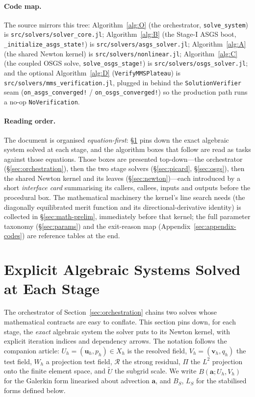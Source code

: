 \documentclass{article}
\newcommand{\code}[1]{\texttt{\small #1}}
\begin{document}
\paragraph{Code map.}  The source mirrors this tree:
Algorithm~\ref{alg:O} (the orchestrator, \code{solve\_system}) is \code{src/solvers/solver\_core.jl};
Algorithm~\ref{alg:B} (the Stage-I ASGS boot, \code{\_initialize\_asgs\_state!}) is
\code{src/solvers/asgs\_solver.jl}; Algorithm~\ref{alg:A} (the shared Newton kernel) is
\code{src/solvers/nonlinear.jl}; Algorithm~\ref{alg:C} (the coupled OSGS solve,
\code{solve\_osgs\_stage!}) is \code{src/solvers/osgs\_solver.jl}; and the optional Algorithm~\ref{alg:D}
(\code{VerifyMMSPlateau}) is \code{src/solvers/mms\_verification.jl}, plugged in behind the
\code{SolutionVerifier} seam (\code{on\_asgs\_converged!} / \code{on\_osgs\_converged!}) so the production
path runs a no-op \code{NoVerification}.

\paragraph{Reading order.}  The document is organised \emph{equation-first}:
§\ref{sec:algebraic-systems} pins down the exact algebraic system solved at
each stage, and the algorithm boxes that follow are read as tasks against
those equations. Those boxes are presented top-down---the orchestrator
(§\ref{sec:orchestration}), then the two stage solvers (§\ref{sec:picard},
§\ref{sec:osgs}), then the shared Newton kernel and its leaves
(§\ref{sec:newton})---each introduced by a short \emph{interface card}
summarising its callers, callees, inputs and outputs before the procedural
box. The mathematical machinery the kernel's line search needs (the
diagonally equilibrated merit function and its directional-derivative
identity) is collected in §\ref{sec:math-prelim}, immediately before that
kernel; the full parameter taxonomy (§\ref{sec:params}) and the exit-reason
map (Appendix~\ref{sec:appendix-codes}) are reference tables at the end.

\section{Explicit Algebraic Systems Solved at Each Stage}
\label{sec:algebraic-systems}

The orchestrator of Section~\ref{sec:orchestration} chains two solves
whose mathematical contracts are easy to conflate. This section pins
down, for each stage, the \emph{exact} algebraic system the solver puts
to its Newton kernel, with explicit iteration indices and dependency
arrows. The notation follows the companion article: $U_h = (\boldsymbol{u}_h, p_h)
\in X_h$ is the resolved field, $V_h = (\boldsymbol{v}_h, q_h)$ the test
field, $W_h$ a projection test field, $\mathcal{R}$ the strong residual,
$\Pi$ the $L^2$ projection onto the finite element space, and
$\widetilde{U}$ the subgrid scale. We write $B(\boldsymbol{a}; U_h, V_h)$
for the Galerkin form linearised about advection $\boldsymbol{a}$, and
$B_S$, $L_S$ for the stabilised forms defined below.
\end{document}
